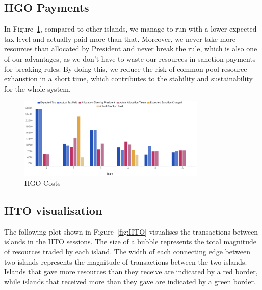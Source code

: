 \subsection{IIGO Payments} \label{subsec:Team6_Eval_IIGO}

In Figure~\ref{fig:IIGO}, compared to other islands, we manage to run with a lower expected tax level and actually paid more than that. Moreover, we never take more resources than allocated by President and never break the rule, which is also one of our advantages, as we don’t have to waste our resources in sanction payments for breaking rules. By doing this, we reduce the risk of common pool resource exhaustion in a short time, which contributes to the stability and sustainability for the whole system.\\
\begin{figure}[H]
    \centering
    \includegraphics[width=0.8\textwidth]{14_team6_agentdesign/images/IIGO cost.png}
    \caption{IIGO Costs}
    \label{fig:IIGO}
\end{figure}

\subsection{IITO visualisation} \label{subsec:Team6_Eval_IITO}
The following plot shown in Figure~\ref{fig:IITO} visualises the transactions between islands in the IITO sessions. The size of a bubble represents the total magnitude of resources traded by each island. The width of each connecting edge between two islands represents the magnitude of transactions between the two islands. Islands that gave more resources than they receive are indicated by a red border, while islands that received more than they gave are indicated by a green border.

